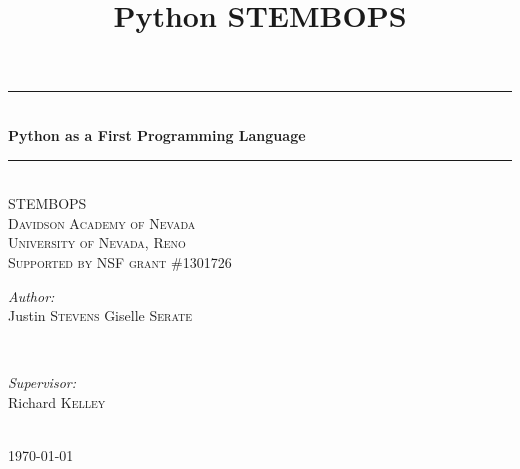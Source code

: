 \documentclass[12pt,openany]{book} %
\theoremstyle{definition}
\newcommand{\HRule}{\rule{\linewidth}{0.5mm}} %
\begin{document}
\title{Python STEMBOPS}

 \begin{center}  

\HRule \\[0.4cm]
{ \huge \bfseries Python as a First Programming Language }\\[0.4cm] %
\HRule \\[0.8cm]
\textsc{\Large STEMBOPS}\\[0.5cm] %
\textsc{\Large Davidson Academy of Nevada}\\[0.2cm] %
\textsc{\Large University of Nevada, Reno} \\[0.5cm]
\textsc{\large Supported by NSF grant \#1301726}\\[0.2cm] %

\begin{minipage}{0.4\textwidth}
\begin{flushleft} \large
\emph{Author:}\\
Justin \textsc{Stevens} \newline
Giselle \textsc{Serate}

\end{flushleft}
\end{minipage}
~
\begin{minipage}{0.4\textwidth}
\begin{flushright} \large
\emph{Supervisor:} \\
Richard \textsc{Kelley} %
\end{flushright}
\end{minipage}\\[1cm]
{\large \today}\\[0.2cm] %


\end{center}  

	
\end{document}
